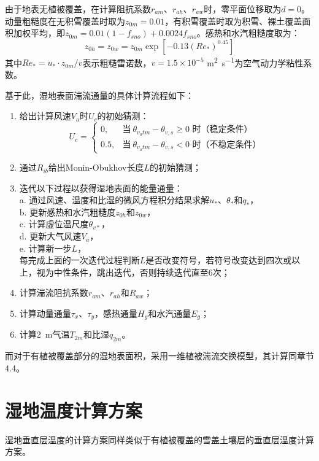 由于地表无植被覆盖，在计算阻抗系数$r_{am}$、$r_{ah}$、$r_{aw}$时，零平面位移取为$d=0$。动量粗糙度在无积雪覆盖时取为$z_{0m}=0.01$，有积雪覆盖时取为积雪、裸土覆盖面积加权平均，即$z_{0m}=0.01 \left(1-f_{sno}\right)+0.0024 f_{sno}$。感热和水汽粗糙度取为：
\begin{equation}
    z_{0h}=z_{0w}=z_{0m}\exp{\left[-0.13\left(Re_*\right)^{0.45}\right]}
\end{equation}
其中$Re_*=u_*\cdot z_{0m}/v$表示粗糙雷诺数，$v= 1.5 \times 10^{-5}$ \unit{m^2.s^{-1}}为空气动力学粘性系数。

基于此，湿地表面湍流通量的具体计算流程如下：
\begin{enumerate}
    \item 给出计算风速$V_a$时$U_c$的初始猜测：
        \begin{equation}
            U_c = \begin{cases}
                0, &\text{当}\ \theta_{v_atm}-\theta_{v,s} \geqslant 0 \text{ 时（稳定条件）} \\
                0.5, &\text{当}\ \theta_{v_atm}-\theta_{v,s} < 0 \text{ 时（不稳定条件）}
            \end{cases}
        \end{equation}
    \item 通过$R_{ib}$给出Monin-Obukhov长度$L$的初始猜测；
    \item 迭代以下过程以获得湿地表面的能量通量：\\
        a. 通过风速、温度和比湿的微风方程积分结果求解$u_*$、$\theta_*$和$q_*$，\\
        b. 更新感热和水汽粗糙度$z_{0h}$和$z_{0w}$，\\
        c. 计算虚位温尺度$\theta_{v*}$，\\
        d. 更新大气风速$V_a$，\\
        e. 计算新一步$L$，\\
        每完成上面的一次迭代过程判断$L$是否改变符号，若符号改变达到四次或以上，视为中性条件，跳出迭代，否则持续迭代直至6次；
    \item 计算湍流阻抗系数$r_{am}$、$r_{ah}$和$R_{aw}$；
    \item 计算动量通量$\tau_x$、$\tau_y$，感热通量$H_g$和水汽通量$E_g$；
    \item 计算\qty{2}{m}气温$T_{2m}$和比湿$q_{2m}$。
\end{enumerate}
而对于有植被覆盖部分的湿地表面积，采用一维植被湍流交换模型，其计算同章节4.4。


\section{湿地温度计算方案}
湿地垂直层温度的计算方案同样类似于有植被覆盖的雪盖土壤层的垂直层温度计算方案。

